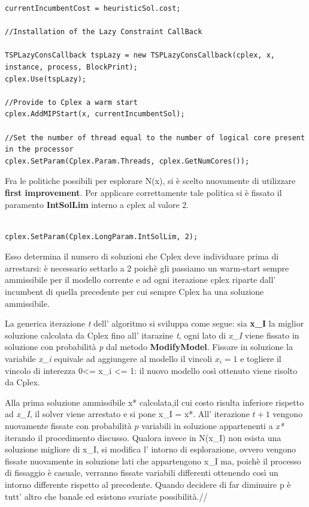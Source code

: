 \documentclass[11pt]{article}
\begin{document}
\begin{lstlisting}
currentIncumbentCost = heuristicSol.cost;

//Installation of the Lazy Constraint CallBack

TSPLazyConsCallback tspLazy = new TSPLazyConsCallback(cplex, x, instance, process, BlockPrint);
cplex.Use(tspLazy);

//Provide to Cplex a warm start
cplex.AddMIPStart(x, currentIncumbentSol);

//Set the number of thread equal to the number of logical core present in the processor
cplex.SetParam(Cplex.Param.Threads, cplex.GetNumCores());
\end{lstlisting}


Fra le politiche possibili per esplorare N(x), si è scelto nuovamente di utilizzare \textbf{first improvement}. Per applicare correttamente tale politica si è fissato il paramento \textbf{IntSolLim} interno a cplex al valore 2.

\begin{lstlisting}

cplex.SetParam(Cplex.LongParam.IntSolLim, 2);

\end{lstlisting}

Esso determina il numero di soluzioni che Cplex deve individuare prima di arrestarsi: è necessario settarlo a 2 poichè gli passiamo un warm-start sempre ammissibile per il modello corrente e ad ogni iterazione cplex riparte dall' incumbent di quella precedente per cui sempre Cplex ha una soluzione ammissibile.


La generica iterazione \textit{t} dell' algoritmo si sviluppa come segue: sia \textbf{x_I} la miglior soluzione calcolata da Cplex fino all' itarazine \textit{t}, ogni lato di \textit{x_I} viene fissato in soluzione con probabilità \textit{p} dal metodo \textbf{ModifyModel}. Fissare in soluzione la variabile \textit{x_i} equivale ad aggiungere al modello il vincoli $x_i = 1$ e togliere il vincolo di interezza 0<= x_i <= 1: il nuovo modello così ottenuto viene risolto da Cplex.

Alla prima soluzione ammissibile x* calcolata,il cui costo risulta inferiore rispetto ad \textit{x_I}, il solver viene arrestato e si pone x_I = x*. All' iterazione $t + 1$ vengono nuovamente fissate con probabilità $p$ variabili in soluzione appartenenti a \textit{x*}  iterando il procedimento discusso. Qualora invece in N(x_I) non esista una soluzione migliore di x_I, si modifica l' intorno di esplorazione, ovvero vengono fissate nuovamente in soluzione lati che appartengono x_I ma, poichè il processo di fissaggio è casuale, verranno fissate variabili differenti ottenendo così un intorno differente rispetto al precedente. Quando decidere di far diminuire p è tutt' altro che banale ed esistono svariate possibilità.//
\end{document}
